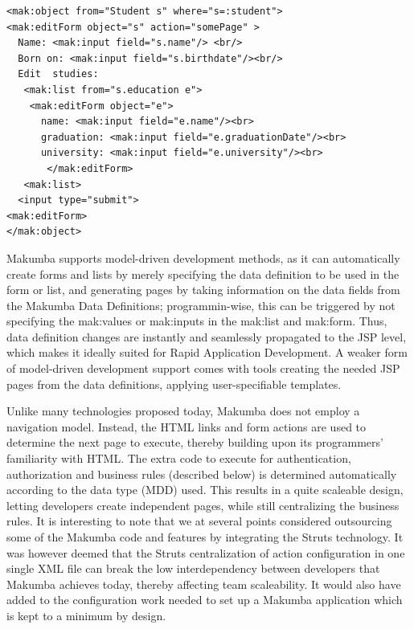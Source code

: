 \documentclass{llncs}
\begin{document}
\lstset{basicstyle=\small, captionpos=b, caption=Example of changing data with the Makumba JSP tag library, label=form:mak, frame=shadowbox}
\begin{lstlisting}
<mak:object from="Student s" where="s=:student">
<mak:editForm object="s" action="somePage" >
  Name: <mak:input field="s.name"/> <br/>
  Born on: <mak:input field="s.birthdate"/><br/>
  Edit  studies:
   <mak:list from="s.education e"> 
   	<mak:editForm object="e">
   	  name: <mak:input field="e.name"/><br>      
	  graduation: <mak:input field="e.graduationDate"/><br>      
	  university: <mak:input field="e.university"/><br>
       </mak:editForm>
   <mak:list>
  <input type="submit">
<mak:editForm>
</mak:object>
\end{lstlisting}

Makumba supports model-driven development methods, as it can automatically create forms and lists by merely specifying the data definition to be used in the form or list, and generating pages by taking information on the data fields from the Makumba Data Definitions; programmin-wise, this can be triggered by not specifying the mak:values or mak:inputs in the mak:list and mak:form. Thus, data definition changes are instantly and seamlessly propagated to the JSP level, which makes it ideally suited for Rapid Application Development. A weaker form of model-driven development support comes with tools creating the needed JSP pages from the data definitions, applying user-specifiable templates.

Unlike many technologies proposed today, Makumba does not employ a navigation model. Instead, the HTML links and form actions are used to determine the next page to execute, thereby building upon its programmers' familiarity with HTML. The extra code to execute for authentication, authorization and business rules (described below) is determined automatically according to the data type (MDD) used. This results in a quite scaleable design, letting developers create independent pages, while still centralizing the business rules. It is interesting to note that we at several points considered outsourcing some of the Makumba code and features by integrating the Struts technology. It was however deemed that the Struts centralization of action configuration in one single XML file can break the low interdependency between developers that Makumba achieves today, thereby affecting team scaleability. It would also have added to the configuration work needed to set up a Makumba application which is kept to a minimum by design.
\end{document}
